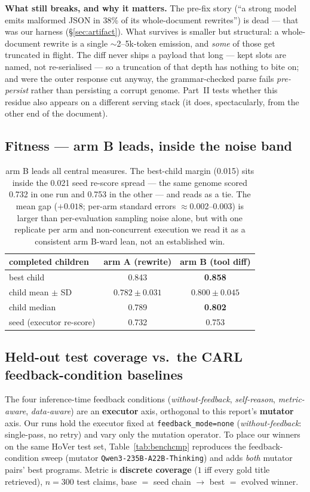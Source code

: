 \documentclass[11pt]{article}
\newcommand{\armA}{\textcolor{bad}{arm A}}
\newcommand{\armB}{\textcolor{accent}{arm B}}
\begin{document}
\noindent\textbf{What still breaks, and why it matters.} The pre-fix story (``a strong model
emits malformed JSON in 38\% of its whole-document rewrites'') is dead --- that was our harness
(\S\ref{sec:artifact}). What survives is smaller but structural: a whole-document rewrite is a
single $\sim$2--5k-token emission, and \emph{some} of those get truncated in flight. The diff
never ships a payload that long --- kept slots are named, not re-serialised --- so a truncation
of that depth has nothing to bite on; and were the outer response cut anyway, the
grammar-checked parse fails \emph{pre-persist} rather than persisting a corrupt genome.
Part~II tests whether this residue also appears on a different serving stack (it does,
spectacularly, from the other end of the document).

\subsection{Fitness --- \armB{} leads, inside the noise band}
\begin{table}[H]\centering
\begin{tabular}{lcc}
\toprule
completed children & \armA{} (rewrite) & \armB{} (tool diff) \\
\midrule
best child & 0.843 & \textbf{\textcolor{good}{0.858}} \\
child mean $\pm$ SD & $0.782 \pm 0.031$ & \textbf{\textcolor{good}{$0.800 \pm 0.045$}} \\
child median & 0.789 & \textbf{\textcolor{good}{0.802}} \\
seed (executor re-score) & 0.732 & 0.753 \\
\bottomrule
\end{tabular}
\caption{\armB{} leads all central measures. The best-child margin (0.015) sits inside the 0.021
seed re-score spread --- the same genome scored 0.732 in one run and 0.753 in the other --- and
reads as a tie. The mean gap ($+0.018$; per-arm standard errors $\approx$0.002--0.003) is larger
than per-evaluation sampling noise alone, but with one replicate per arm and non-concurrent
execution we read it as a consistent \armB-ward lean, not an established win.}
\end{table}

\subsection{Held-out test coverage vs.\ the CARL feedback-condition baselines}
\label{sec:benchcmp}
The four inference-time feedback conditions (\emph{without-feedback}, \emph{self-reason},
\emph{metric-aware}, \emph{data-aware}) are an \textbf{executor} axis, orthogonal to this
report's \textbf{mutator} axis. Our runs hold the executor fixed at \texttt{feedback\_mode=none}
(\emph{without-feedback}: single-pass, no retry) and vary only the mutation operator. To place
our winners on the same HoVer test set, Table~\ref{tab:benchcmp} reproduces the feedback-condition
sweep (mutator \texttt{Qwen3-235B-A22B-Thinking}) and adds \emph{both} mutator pairs' best
programs. Metric is \textbf{discrete coverage} ($1$ iff every gold title
retrieved), $n=300$ test claims, base $=$ seed chain $\to$ best $=$ evolved winner.
\end{document}
